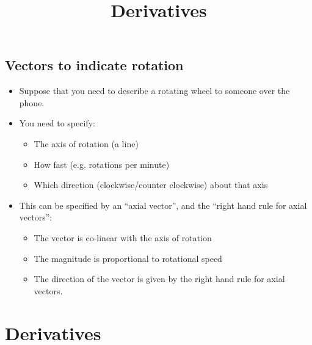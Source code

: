 \documentclass[aspectratio=169,
hyperref={colorlinks,urlcolor=blue}
]{beamer}
\begin{document}
\subsection{Vectors to indicate rotation}
\label{subsec:rotationvectors}
{
\begin{itemize}
\item Suppose that you need to describe a rotating wheel to someone over the phone.
\item You need to specify:
\begin{itemize}
\item The axis of rotation (a line)
\item How fast (e.g. rotations per minute)
\item Which direction (clockwise/counter clockwise) about that axis
\end{itemize}
\item This can be specified by an “axial vector”, and the “right hand rule for axial vectors”:
\begin{itemize}
\item The vector is co-linear with the axis of rotation
\item The magnitude is proportional to rotational speed
\item The direction of the vector is given by the right hand rule for axial vectors.
\end{itemize}
\end{itemize}
}
{
\label{fig:math:righthandruleaxial}
\label{fig:math:carwheelrotation}
}
\section{Derivatives}
\label{sec:derivatives}
\title{Derivatives}
\author{\insertsubsection}


\begin{frame}
\titlepage
\thispagestyle{empty}
\end{frame}

\end{document}
